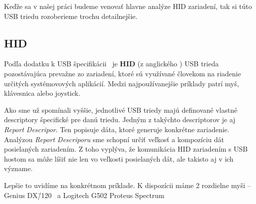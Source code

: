Keďže sa v našej práci budeme venovať hlavne analýze HID zariadení, tak si túto USB triedu rozoberieme trochu detailnejšie.

\subsection*{HID}
\label{uvod:sec:HID}

Podľa dodatku k USB špecifikácii~\cite{usbhid} je \textbf{HID} (z anglického ) USB trieda pozostávajúca prevažne zo zariadení, ktoré sú využívané človekom na riadenie určitých systémovových aplikácií. Medzi najpoužívanejšie príklady patrí myš, klávesnica alebo joystick.

Ako sme už spomínali vyššie, jednotlivé USB triedy majú definované vlastné descriptory špecifické pre danú triedu. Jedným z takýchto descriptorov je aj \textit{Report Descripor}. Ten popisuje dáta, ktoré generuje konkrétne zariadenie. Analýzou \textit{Report Descriporu} sme schopní určiť veľkosť a kompozíciu dát posielaných zariadením. Z toho vyplýva, že komunikácia HID zariadením s USB hostom sa môže líšiť nie len vo veľkosti posielaných dát, ale takisto aj v ich význame.

Lepšie to uvidíme na konkrétnom príklade. K dispozícii máme 2 rozdielne myši -- Genius DX\=/120~\cite{genius_mouse} a Logitech G502 Proteus Spectrum~\cite{logitech_mouse}

